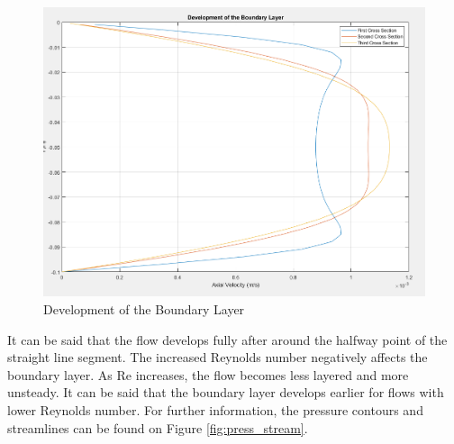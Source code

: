 \begin{figure}[H]
    \centering
    \includegraphics[width=.7\textwidth]{images/task1/development.png}
    \caption{Development of the Boundary Layer}
    \label{fig:development}
\end{figure}

It can be said that the flow develops fully after around the halfway point of the straight line segment. The increased Reynolds number negatively affects the boundary layer. As Re increases, the flow becomes less layered and more unsteady. It can be said that the boundary layer develops earlier for flows with lower Reynolds number. For further information, the pressure contours and streamlines can be found on Figure \ref{fig:press_stream}. 

